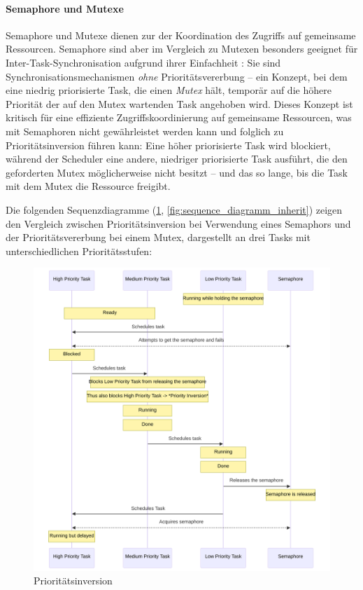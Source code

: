 \paragraph{Semaphore und Mutexe} \label{sec:mutex}

Semaphore und Mutexe dienen zur der Koordination des Zugriffs auf gemeinsame
Ressourcen. Semaphore sind aber im Vergleich zu Mutexen besonders geeignet für
Inter-Task-Synchronisation aufgrund ihrer Einfachheit
\cite{freertos_semphr_doc}: Sie sind Synchronisationsmechanismen \textit{ohne}
Prioritätsvererbung -- ein Konzept, bei dem eine niedrig priorisierte Task, die
einen \textit{Mutex} hält, temporär auf die höhere Priorität der auf den Mutex
wartenden Task angehoben wird. Dieses Konzept ist kritisch für eine effiziente
Zugriffskoordinierung auf gemeinsame Ressourcen, was mit Semaphoren nicht
gewährleistet werden kann und folglich zu Prioritätsinversion führen kann: Eine
höher priorisierte Task wird blockiert, während der Scheduler eine andere,
niedriger priorisierte Task ausführt, die den geforderten Mutex möglicherweise
nicht besitzt -- und das so lange, bis die Task mit dem Mutex die Ressource
freigibt.

Die folgenden Sequenzdiagramme (\ref{fig:sequence_diagramm_invert},
\ref{fig:sequence_diagramm_inherit}) zeigen den Vergleich zwischen
Prioritätsinversion bei Verwendung eines Semaphors und der Prioritätsvererbung
bei einem Mutex, dargestellt an drei Tasks mit unterschiedlichen
Prioritätsstufen:

\begin{figure}[H]
    \centering
    \includegraphics[width=1\textwidth]{assets/prio_inversion}
    \caption{Prioritätsinversion}
    \label{fig:sequence_diagramm_invert}
\end{figure}

